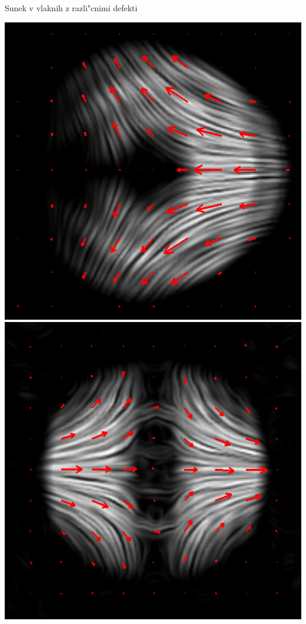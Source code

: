\documentclass{beamer}
\begin{document}
\begin{frame}{Sunek v vlaknih z razli"cnimi defekti}
\begin{center}
  \includegraphics[height=.35\textheight]{./Slike/licp_m12_68} \\
  \includegraphics[height=.35\textheight]{./Slike/licp_m1_82} \quad

\end{center}
\end{frame}
\end{document}

